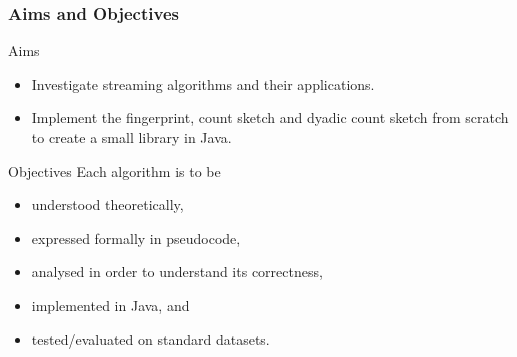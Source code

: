 \documentclass{beamer}
\begin{document}
\begin{frame}
  \frametitle{Aims and Objectives}

  \begin{block}{Aims}
    \begin{itemize}
      \item Investigate streaming algorithms and their applications.
      \item Implement the \alert{fingerprint}, \alert{count sketch} and \alert{dyadic count sketch} from scratch to create a small library in Java.
    \end{itemize}
  \end{block}

  \begin{block}{Objectives}
    Each algorithm is to be
    \begin{itemize}
      \item understood theoretically,
      \item expressed formally in pseudocode,
      \item analysed in order to understand its correctness,
      \item implemented in Java, and
      \item tested/evaluated on standard datasets.
    \end{itemize}
  \end{block}
\end{frame}
\end{document}

